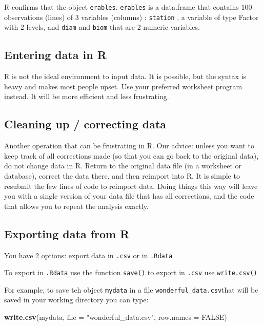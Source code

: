 \documentclass[
  12pt,
]{book}
\newenvironment{Shaded}{\begin{snugshade}}{\end{snugshade}}
\newcommand{\DataTypeTok}[1]{\textcolor[rgb]{0.13,0.29,0.53}{#1}}
\newcommand{\KeywordTok}[1]{\textcolor[rgb]{0.13,0.29,0.53}{\textbf{#1}}}
\newcommand{\NormalTok}[1]{#1}
\newcommand{\OtherTok}[1]{\textcolor[rgb]{0.56,0.35,0.01}{#1}}
\newcommand{\StringTok}[1]{\textcolor[rgb]{0.31,0.60,0.02}{#1}}
\begin{document}
R confirms that the object \texttt{erables}.
\texttt{erables} is a data.frame that contains 100 observations (lines) of 3 variables (columns) : \texttt{station} , a variable of type Factor with 2
levels, and \texttt{diam} and \texttt{biom} that are 2 numeric variables.

\hypertarget{entering-data-in-r}{%
\subsection{Entering data in R}\label{entering-data-in-r}}

R is not the ideal environment to input data. It is possible, but the syntax is heavy and makes most people upset. Use your preferred worksheet program instead. It will be more efficient and less frustrating.

\hypertarget{cleaning-up-correcting-data}{%
\subsection{Cleaning up / correcting data}\label{cleaning-up-correcting-data}}

Another operation that can be frustrating in R. Our advice: unless you want to keep track of all corrections made (so that you can go back to the original data), do not change data in R. Return to the original data file (in a worksheet or database), correct the data there, and then reimport into R. It is simple to resubmit the few lines of code to reimport data. Doing things this way will leave you with a single version of your data file that has all corrections, and the code that allows you to repeat the analysis exactly.

\hypertarget{exporting-data-from-r}{%
\subsection{Exporting data from R}\label{exporting-data-from-r}}

You have 2 options: export data in \texttt{.csv} or in \texttt{.Rdata}

To export in \texttt{.Rdata} use the function \texttt{save()} to export in \texttt{.csv} use \texttt{write.csv()}

For example, to save teh object \texttt{mydata} in a file \texttt{wonderful\_data.csv}that will be saved in your working directory you can type:

\begin{Shaded}
\begin{Highlighting}[]
\KeywordTok{write.csv}\NormalTok{(mydata, }\DataTypeTok{file =} \StringTok{"wonderful\_data.csv"}\NormalTok{, }\DataTypeTok{row.names =} \OtherTok{FALSE}\NormalTok{)}
\end{Highlighting}
\end{Shaded}
\end{document}
